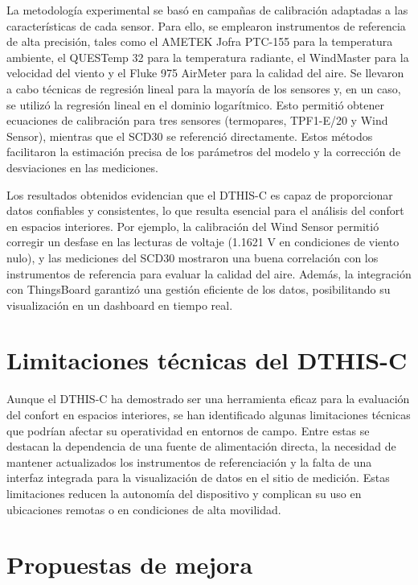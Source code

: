\documentclass[
  letterpaper,
]{scrbook}
\begin{document}
La metodología experimental se basó en campañas de calibración adaptadas
a las características de cada sensor. Para ello, se emplearon
instrumentos de referencia de alta precisión, tales como el AMETEK Jofra
PTC-155 para la temperatura ambiente, el QUESTemp 32 para la temperatura
radiante, el WindMaster para la velocidad del viento y el Fluke 975
AirMeter para la calidad del aire. Se llevaron a cabo técnicas de
regresión lineal para la mayoría de los sensores y, en un caso, se
utilizó la regresión lineal en el dominio logarítmico. Esto permitió
obtener ecuaciones de calibración para tres sensores (termopares,
TPF1-E/20 y Wind Sensor), mientras que el SCD30 se referenció
directamente. Estos métodos facilitaron la estimación precisa de los
parámetros del modelo y la corrección de desviaciones en las mediciones.

Los resultados obtenidos evidencian que el DTHIS-C es capaz de
proporcionar datos confiables y consistentes, lo que resulta esencial
para el análisis del confort en espacios interiores. Por ejemplo, la
calibración del Wind Sensor permitió corregir un desfase en las lecturas
de voltaje (1.1621 V en condiciones de viento nulo), y las mediciones
del SCD30 mostraron una buena correlación con los instrumentos de
referencia para evaluar la calidad del aire. Además, la integración con
ThingsBoard garantizó una gestión eficiente de los datos, posibilitando
su visualización en un dashboard en tiempo real.

\section{Limitaciones técnicas del
DTHIS-C}\label{limitaciones-tuxe9cnicas-del-dthis-c}

Aunque el DTHIS-C ha demostrado ser una herramienta eficaz para la
evaluación del confort en espacios interiores, se han identificado
algunas limitaciones técnicas que podrían afectar su operatividad en
entornos de campo. Entre estas se destacan la dependencia de una fuente
de alimentación directa, la necesidad de mantener actualizados los
instrumentos de referenciación y la falta de una interfaz integrada para
la visualización de datos en el sitio de medición. Estas limitaciones
reducen la autonomía del dispositivo y complican su uso en ubicaciones
remotas o en condiciones de alta movilidad.

\section{Propuestas de mejora}\label{propuestas-de-mejora}
\end{document}
